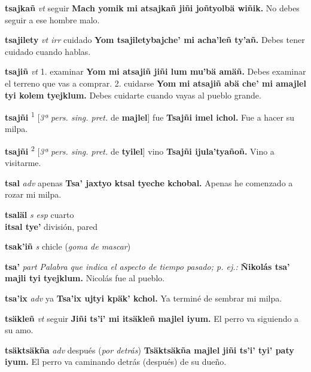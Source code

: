 \documentclass[10pt]{scrbook}
\newcommand{\entry}[1]{\textbf{#1}}
\newcommand{\onedefinition}[1]{#1.}
\newcommand{\defsuperscript}[1]{\textsuperscript{#1}}
\newcommand{\nontranslationdef}[1]{\textit{#1}}
\newcommand{\partofspeech}[1]{\textit{#1}}
\newcommand{\spanishtranslation}[1]{#1}
\newcommand{\clarification}[1]{(\textit{#1})}
\newcommand{\cholexample}[1]{\textbf{#1}}
\newcommand{\exampletranslation}[1]{#1}
\newcommand{\secondaryentry}[1]{\\\textbf{#1}}
\newcommand{\secondtranslation}[1]{#1}
\newcommand{\conjugationtense}[1]{[\textit{#1}}
\newcommand{\conjugationverb}[1]{de \textbf{#1}]}
\begin{document}
\begin{multicols}{2}
\entry{tsajkañ}
\partofspeech{vt}
\spanishtranslation{seguir}
\cholexample{Mach yomik mi atsajkañ jiñi joñtyolbä wiñik.}
\exampletranslation{No debes seguir a ese hombre malo.}

\entry{tsajilety}
\partofspeech{vt irr}
\spanishtranslation{cuidado}
\cholexample{Yom tsajiletybajche' mi acha'leñ ty'añ.}
\exampletranslation{Debes tener cuidado cuando hablas.}

\entry{tsajiñ}
\partofspeech{vt}
\onedefinition{1}
\spanishtranslation{examinar}
\cholexample{Yom mi atsajiñ jiñi lum mu'bä amäñ.}
\exampletranslation{Debes examinar el terreno que vas a comprar.}
\onedefinition{2}
\spanishtranslation{cuidarse}
\cholexample{Yom mi atsajiñ abä che' mi amajlel tyi kolem tyejklum.}
\exampletranslation{Debes cuidarte cuando vayas al pueblo grande.}

\entry{tsajñi}
\defsuperscript{1}
\conjugationtense{3ª pers. sing. pret.}
\conjugationverb{majlel}
\spanishtranslation{fue}
\cholexample{Tsajñi imel ichol.}
\exampletranslation{Fue a hacer su milpa.}

\entry{tsajñi}
\defsuperscript{2}
\conjugationtense{3ª pers. sing. pret.}
\conjugationverb{tyilel}
\spanishtranslation{vino}
\cholexample{Tsajñi ijula'tyañoñ.}
\exampletranslation{Vino a visitarme.}

\entry{tsal}
\partofspeech{adv}
\spanishtranslation{apenas}
\cholexample{Tsa' jaxtyo ktsal tyeche kchobal.}
\exampletranslation{Apenas he comenzado a rozar mi milpa.}

\entry{tsaläl}
\partofspeech{s esp}
\spanishtranslation{cuarto}
\secondaryentry{itsal tye'}
\secondtranslation{división, pared}

\entry{tsak'iñ}
\partofspeech{s}
\spanishtranslation{chicle}
\clarification{goma de mascar}

\entry{tsa'}
\partofspeech{part}
\nontranslationdef{Palabra que indica el aspecto de tiempo pasado; p. ej.:}
\cholexample{Ñikolás tsa' majli tyi tyejklum.}
\exampletranslation{Nicolás fue al pueblo.}

\entry{tsa'ix}
\partofspeech{adv}
\spanishtranslation{ya}
\cholexample{Tsa'ix ujtyi kpäk' kchol.}
\exampletranslation{Ya terminé de sembrar mi milpa.}

\entry{tsäkleñ}
\partofspeech{vt}
\spanishtranslation{seguir}
\cholexample{Jiñi ts'i' mi itsäkleñ majlel iyum.}
\exampletranslation{El perro va siguiendo a su amo.}

\entry{tsäktsäkña}
\partofspeech{adv}
\spanishtranslation{después}
\clarification{por detrás}
\cholexample{Tsäktsäkña majlel jiñi ts'i' tyi' paty iyum.}
\exampletranslation{El perro va caminando detrás (después) de su dueño.}


\end{multicols}
\end{document}
